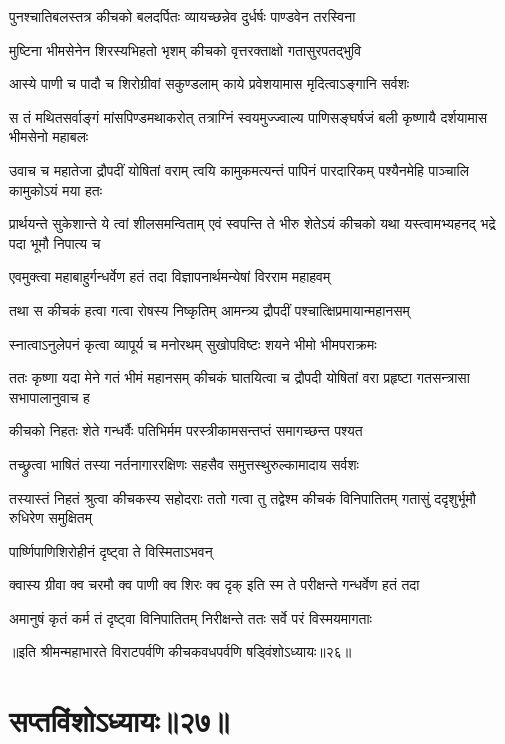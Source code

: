 \twolineshloka
{पुनश्चातिबलस्तत्र कीचको बलदर्पितः}
{व्यायच्छन्नेव दुर्धर्षः पाण्डवेन तरस्विना}


\twolineshloka
{मुष्टिना भीमसेनेन शिरस्यभिहतो भृशम्}
{कीचको वृत्तरक्ताक्षो गतासुरपतद्भुवि}


\twolineshloka
{आस्ये पाणी च पादौ च शिरोग्रीवां सकुण्डलाम्}
{काये प्रवेशयामास मृदित्वाऽङ्गानि सर्वशः}


\onelineshloka
{स तं मथितसर्वाङ्गं मांसपिण्डमथाकरोत्}
\twolineshloka
{तत्राग्निं स्वयमुज्ज्वाल्य पाणिसङ्घर्षजं बली}
{कृष्णायै दर्शयामास भीमसेनो महाबलः}


\threelineshloka
{उवाच च महातेजा द्रौपदीं योषितां वराम्}
{त्वयि कामुकमत्यन्तं पापिनं पारदारिकम्}
{पश्यैनमेहि पाञ्चालि कामुकोऽयं मया हतः}


\threelineshloka
{प्रार्थयन्ते सुकेशान्ते ये त्वां शीलसमन्विताम्}
{एवं स्वपन्ति ते भीरु शेतेऽयं कीचको यथा}
{यस्त्वामभ्यहनद् भद्रे पदा भूमौ निपात्य च}


\twolineshloka
{एवमुक्त्वा महाबाहुर्गन्धर्वेण हतं तदा}
{विज्ञापनार्थमन्येषां विरराम महाहवम्}


\twolineshloka
{तथा स कीचकं हत्वा गत्वा रोषस्य निष्कृतिम्}
{आमन्त्र्य द्रौपदीं पश्चात्क्षिप्रमायान्महानसम्}


\twolineshloka
{स्नात्वाऽनुलेपनं कृत्वा व्यापूर्य च मनोरथम्}
{सुखोपविष्टः शयने भीमो भीमपराक्रमः}


\threelineshloka
{ततः कृष्णा यदा मेने गतं भीमं महानसम्}
{कीचकं घातयित्वा च द्रौपदी योषितां वरा}
{प्रहृष्टा गतसन्त्रासा सभापालानुवाच ह}


\twolineshloka
{कीचको निहतः शेते गन्धर्वैः पतिभिर्मम}
{परस्त्रीकामसन्तप्तं समागच्छन्त पश्यत}


\twolineshloka
{तच्छ्रुत्वा भाषितं तस्या नर्तनागाररक्षिणः}
{सहसैव समुत्तस्थुरुल्कामादाय सर्वशः}


\threelineshloka
{तस्यास्तं निहतं श्रुत्वा कीचकस्य सहोदराः}
{ततो गत्वा तु तद्वेश्म कीचकं विनिपातितम्}
{गतासुं ददृशुर्भूमौ रुधिरेण समुक्षितम्}


\onelineshloka
{पार्ष्णिपाणिशिरोहीनं दृष्ट्वा ते विस्मिताऽभवन्}

\twolineshloka
{क्वास्य ग्रीवा क्व चरमौ क्व पाणी क्व शिरः क्व दृक्}
{इति स्म ते परीक्षन्ते गन्धर्वेण हतं तदा}


\twolineshloka
{अमानुषं कृतं कर्म तं दृष्ट्वा विनिपातितम्}
{निरीक्षन्ते ततः सर्वे परं विस्मयमागताः}

॥इति श्रीमन्महाभारते विराटपर्वणि कीचकवधपर्वणि षड्विंशोऽध्यायः॥२६॥

\chapter{सप्तविंशोऽध्यायः॥२७॥}

